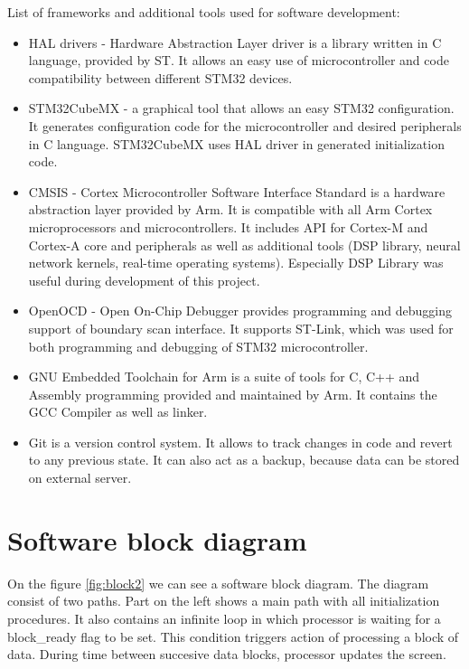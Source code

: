 \documentclass[a4paper,twoside,12pt]{book}
\begin{document}
\newpage

List of frameworks and additional tools used for software development:

\begin{itemize}
    \item HAL drivers
    - Hardware Abstraction Layer driver is a library written in C language, provided by ST.
    It allows an easy use of microcontroller and code compatibility between different STM32 devices.
    \cite{ST:HAL}
    \item STM32CubeMX
    - a graphical tool that allows an easy STM32 configuration.
    It generates configuration code for the microcontroller and desired peripherals in C language.
    STM32CubeMX uses HAL driver in generated initialization code.
    \item CMSIS
    - Cortex Microcontroller Software Interface Standard
    is a hardware abstraction layer provided by Arm.
    It is compatible with all Arm Cortex microprocessors and microcontrollers.
    It includes API for Cortex-M and Cortex-A core and peripherals as well as additional tools
    (DSP library, neural network kernels, real-time operating systems).
    Especially DSP Library was useful during development of this project.
    \cite{CMSIS_DSP}
    \item OpenOCD
    - Open On-Chip Debugger provides programming and debugging support of boundary scan interface.
    It supports ST-Link, which was used for both programming and debugging of STM32 microcontroller.
    \item GNU Embedded Toolchain for Arm
    is a suite of tools for C, C++ and Assembly programming provided and maintained by Arm.
    It contains the GCC Compiler as well as linker.
    \item Git
    is a version control system. It allows to track changes in code
    and revert to any previous state.
    It can also act as a backup, because data can be stored on external server.
\end{itemize}

\newpage

\section{Software block diagram}
On the figure \ref{fig:block2} we can see a software block diagram.
The diagram consist of two paths.
Part on the left shows a main path with all initialization procedures.
It also contains an infinite loop in which processor is waiting
for a block\_ready flag to be set.
This condition triggers action of processing a block of data.
During time between succesive data blocks,
processor updates the screen.
\end{document}
